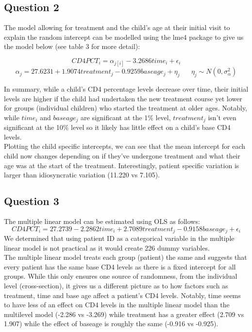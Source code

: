 \documentclass[12pt]{article}
\begin{document}
{\subsection*{Question 2}
The model allowing for treatment and the child's age at their initial visit to explain the random intercept can be modelled using the lme4 package to give us the model below (see table 3 for more detail):

$$CD4PCT_i = \alpha_{j[i]} -3.2686 time_i + \epsilon_i$$
$$\alpha_j = 27.6231 + 1.9074 treatment_j -0.9259 baseage_j + \eta_j \; \; \; \; \; \; \eta_j \sim N(0, \sigma^2_\alpha)$$

In summary, while a child's CD4 percentage levels decrease over time, their initial levels are higher if the child had undertaken the new treatment course yet lower for groups (individual children) who started the treatment at older ages. Notably, while $time_i$ and $baseage_j$ are significant at the 1\% level, $treatment_j$ isn't even significant at the 10\% level so it likely has little effect on a child's base CD4 levels.\\


Plotting the child specific intercepts, we can see that the mean intercept for each child now changes depending on if they've undergone treatment and what their age was at the start of the treatment. Interestingly, patient specific variation is larger than idiosyncratic variation (11.220 vs 7.105).

\subsection*{Question 3}
The multiple linear model can be estimated using OLS as follows:
$$CD4PCT_i = 27.2739 -2.2862 time_i + 2.7089 treatment_j -0.9158 baseage_j + \epsilon_i$$
We determined that using patient ID as a categorical variable in the multiple linear model is not practical as it would create 226 dummy variables.\\

The multiple linear model treats each group (patient) the same and suggests that every patient has the same base CD4 levels as there is a fixed intercept for all groups. While this only ensures one source of randomness, from the individual level (cross-section), it gives us a different picture as to how factors such as treatment, time and base age affect a patient's CD4 levels. Notably, time seems to have less of an effect on CD4 levels in the multiple linear model than the multilevel model (-2.286 vs -3.269) while treatment has a greater effect (2.709 vs 1.907) while the effect of baseage is roughly the same (-0.916 vs -0.925).\\

}
\end{document}
